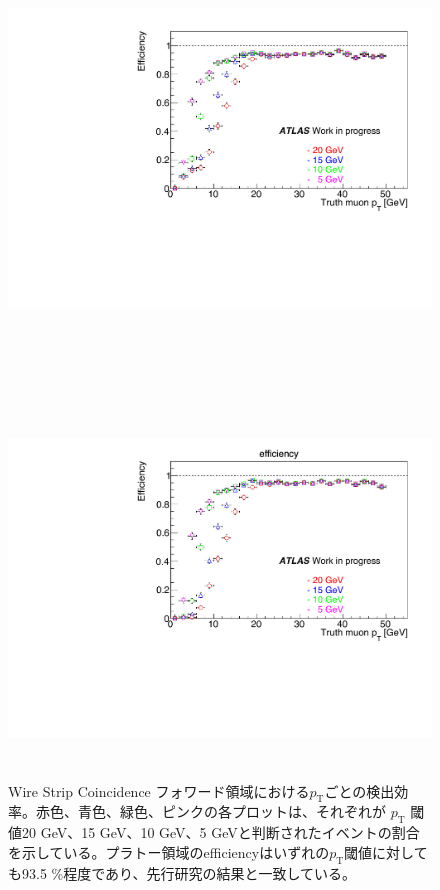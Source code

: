 \begin{figure}
    \begin{minipage}[b]{\linewidth}
    \centering
    \includegraphics[height=10cm]{fig/Test/A_SM_ws_turn.pdf}
    \end{minipage}\\
    \begin{minipage}[b]{\linewidth}
    \centering
    \includegraphics[height=10cm]{fig/Test/A_SM_ws_turnon_bitwise.pdf}
    \end{minipage}%
    \caption[Wire Strip Coincidenceの$p_\mathrm{T}$ごとの検出効率]{Wire Strip Coincidence フォワード領域における$p_\mathrm{T}$ごとの検出効率。赤色、青色、緑色、ピンクの各プロットは、それぞれが $p_{\mathrm{T}}$ 閾値20 GeV、15 GeV、10 GeV、5 GeVと判断されたイベントの割合を示している。プラトー領域のefficiencyはいずれの$p_{\mathrm{T}}$閾値に対しても93.5 \%程度であり、先行研究の結果と一致している。}
    \label{SM_A_WS_turnon}
\end{figure}

